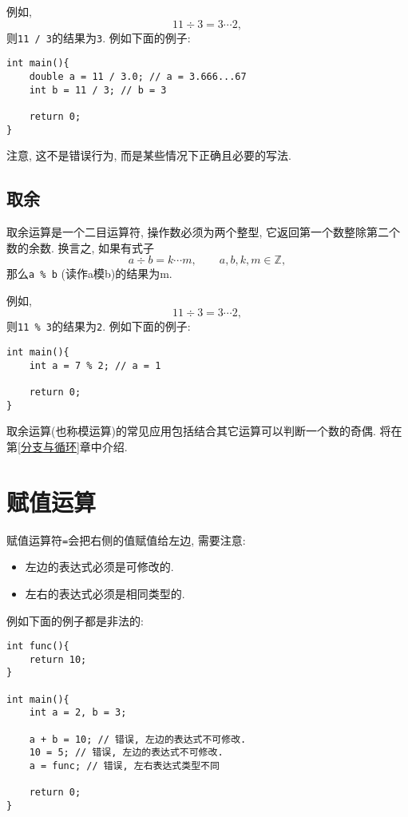             例如,
                \[ 11 \div 3 = 3 \cdots 2,\]
            则\texttt{11 / 3}的结果为\texttt{3}. 例如下面的例子:
\begin{lstlisting}
int main(){
    double a = 11 / 3.0; // a = 3.666...67
    int b = 11 / 3; // b = 3

    return 0;
}
\end{lstlisting}

            注意, 这不是错误行为, 而是某些情况下正确且必要的写法.

        \subsection*{取余}
            取余运算是一个二目运算符, 操作数必须为两个整型, 它返回第一个数整除第二个数的余数. 换言之, 如果有式子
                \[ a \div b = k \cdots m, \qquad a, b, k, m \in \mathbb{Z},\]
            那么\texttt{a \% b} (读作a模b)的结果为m.

            例如,
                \[ 11 \div 3 = 3 \cdots 2,\]
            则\texttt{11 \% 3}的结果为\texttt{2}. 例如下面的例子:
\begin{lstlisting}
int main(){
    int a = 7 % 2; // a = 1

    return 0;
}
\end{lstlisting}

            取余运算(也称模运算)的常见应用包括结合其它运算可以判断一个数的奇偶. 将在第\ref{分支与循环}章中介绍.

    \section{赋值运算} \label{赋值运算}
        赋值运算符\texttt{=}会把右侧的值赋值给左边, 需要注意:
        \begin{itemize}
            \item 左边的表达式必须是可修改的.
            \item 左右的表达式必须是相同类型的.
        \end{itemize}

        例如下面的例子都是非法的:
\begin{lstlisting}
int func(){
    return 10;
}

int main(){
    int a = 2, b = 3;

    a + b = 10; // 错误, 左边的表达式不可修改.
    10 = 5; // 错误, 左边的表达式不可修改.
    a = func; // 错误, 左右表达式类型不同

    return 0;
}
\end{lstlisting}

